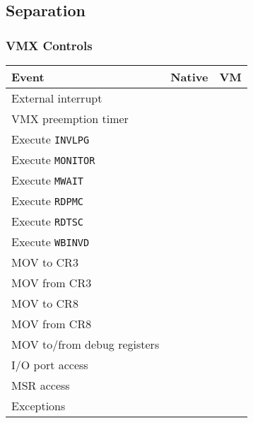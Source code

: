 \documentclass[xcolor={dvipsnames}]{beamer}
\begin{document}
\subsection{Separation}
\begin{frame}\frametitle{VMX Controls}

\begin{small}
\begin{table}[h]
	\centering
	\begin{tabular}{l|c|c}
		\textbf{Event} & \textbf{Native} & \textbf{VM} \\
		\hline
		External interrupt          & \checkmark & \checkmark  \\
		VMX preemption timer        & \checkmark & \checkmark  \\
		Execute \texttt{INVLPG}	    & \checkmark & \checkmark \\
		Execute \texttt{MONITOR}    & \checkmark & \checkmark \\
		Execute \texttt{MWAIT}      & \checkmark & \checkmark \\
		Execute \texttt{RDPMC}      & \checkmark & \checkmark \\
		Execute \texttt{RDTSC}      & \checkmark & \checkmark \\
		Execute \texttt{WBINVD}     & \checkmark & \checkmark \\
		MOV to CR3                  & \checkmark & \\
		MOV from CR3                & \checkmark & \\
		MOV to CR8                  & \checkmark & \checkmark \\
		MOV from CR8                & \checkmark & \checkmark \\
		MOV to/from debug registers & \checkmark & \checkmark \\
		\hline
		I/O port access & \checkmark & \checkmark \\
		MSR access      & \checkmark & \checkmark \\
		Exceptions      & \checkmark & \\
	\end{tabular}
\end{table}
\end{small}
\end{frame}
\end{document}
